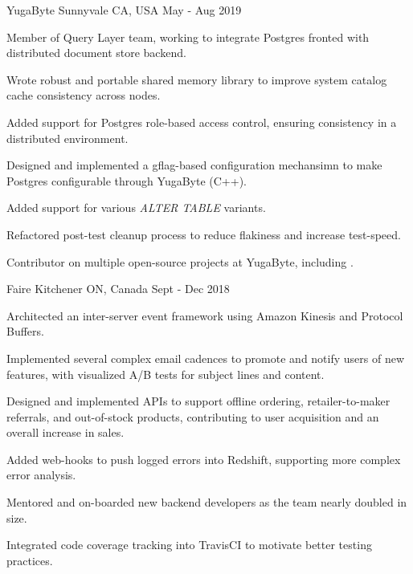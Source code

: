 
\begin{cventries}

   {YugaByte} {Sunnyvale CA, USA} {May - Aug
    2019} {
    \begin{cvitems}
    \item Member of Query Layer team, working to integrate Postgres fronted with
      distributed document store backend.
    \item Wrote robust and portable shared memory library to improve system
      catalog cache consistency across nodes.
    \item Added support for Postgres role-based access control, ensuring
      consistency in a distributed environment.
    \item Designed and implemented a gflag-based configuration mechansimn to
      make Postgres configurable through YugaByte (C++).
    \item Added support for various \textit{ALTER TABLE} variants.
    \item Refactored post-test cleanup process to reduce flakiness and increase
      test-speed.
    \item Contributor on multiple open-source projects at YugaByte, including
      \thinspace
      \href{https://github.com/YugaByte/yugabyte-db/commits?author=srhickma}{\color[HTML]{3090C7}{yugabyte-db
          \faExternalLink}}.
    \end{cvitems}
  }

   {Faire} {Kitchener ON, Canada} {Sept - Dec
    2018} {
    \begin{cvitems}
    \item Architected an inter-server event framework using Amazon Kinesis and
      Protocol Buffers.
    \item Implemented several complex email cadences to promote and notify users
      of new features, with visualized A/B tests for subject lines and content.
    \item Designed and implemented APIs to support offline ordering,
      retailer-to-maker referrals, and out-of-stock products, contributing to
      user acquisition and an overall increase in sales.
    \item Added web-hooks to push logged errors into Redshift, supporting more
      complex error analysis.
    \item Mentored and on-boarded new backend developers as the team nearly
      doubled in size.
    \item Integrated code coverage tracking into TravisCI to motivate better
      testing practices.
    \end{cvitems}
  }
    

\end{cventries}
